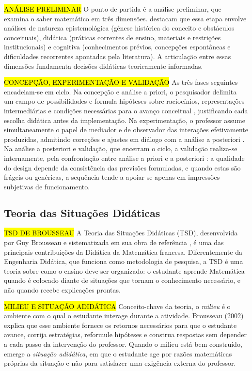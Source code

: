 {\hl {ANÁLISE PRELIMINAR} O ponto de partida é a análise preliminar, que examina o saber matemático em três dimensões.  destacam que essa etapa envolve análises de natureza epistemológica (gênese histórica do conceito e obstáculos conceituais), didática (práticas correntes de ensino, materiais e restrições institucionais) e cognitiva (conhecimentos prévios, concepções espontâneas e dificuldades recorrentes apontadas pela literatura). A articulação entre essas dimensões fundamenta decisões didáticas teoricamente informadas.

\hl {CONCEPÇÃO, EXPERIMENTAÇÃO E VALIDAÇÃO} As três fases seguintes encadeiam-se em ciclo. Na concepção e análise a priori, o pesquisador delimita um campo de possibilidades e formula hipóteses sobre raciocínios, representações intermediárias e condições necessárias para o avanço conceitual \cite{almoulouSilva2012}, justificando cada escolha didática antes da implementação. Na experimentação, o professor assume simultaneamente o papel de mediador e de observador das interações efetivamente produzidas, admitindo correções e ajustes em diálogo com a análise a posteriori \cite{almoulouCoutinho2008}. Na análise a posteriori e validação, que encerram o ciclo, a validação realiza-se internamente, pela confrontação entre análise a priori e a posteriori \cite{artigue1996}: a qualidade do design depende da consistência das previsões formuladas, e quando estas são frágeis ou genéricas, a sequência tende a apoiar-se apenas em impressões subjetivas de funcionamento.

\subsection{Teoria das Situações Didáticas}

\hl {TSD DE BROUSSEAU} A Teoria das Situações Didáticas (TSD), desenvolvida por Guy Brousseau e sistematizada em sua obra de referência \cite{brousseau2002}, é uma das principais contribuições da Didática da Matemática francesa. Diferentemente da Engenharia Didática, que funciona como metodologia de pesquisa, a TSD é uma teoria sobre como o ensino deve ser organizado: o estudante aprende Matemática quando é colocado diante de situações que tornam o conhecimento necessário, e não quando recebe explicações prontas.

\hl {MILIEU E SITUAÇÃO ADIDÁTICA} Conceito-chave da teoria, o \emph{milieu} é o ambiente com o qual o estudante interage durante a atividade. Brousseau (2002) explica que esse ambiente fornece os retornos necessários para que o estudante avance, corrija estratégias, reformule hipóteses e construa respostas sem depender a cada passo da intervenção do professor. Quando o milieu está bem construído, emerge a \emph{situação adidática}, em que o estudante age por razões matemáticas próprias da situação e não para satisfazer uma exigência externa do professor.

}
